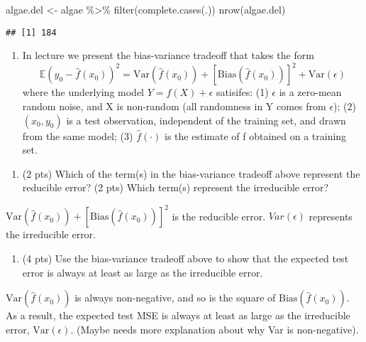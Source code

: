 \documentclass[
]{article}
\newenvironment{Shaded}{\begin{snugshade}}{\end{snugshade}}
\newcommand{\FunctionTok}[1]{\textcolor[rgb]{0.00,0.00,0.00}{#1}}
\newcommand{\NormalTok}[1]{#1}
\newcommand{\OtherTok}[1]{\textcolor[rgb]{0.56,0.35,0.01}{#1}}
\newcommand{\SpecialCharTok}[1]{\textcolor[rgb]{0.00,0.00,0.00}{#1}}
\providecommand{\tightlist}{%
  \setlength{\itemsep}{0pt}\setlength{\parskip}{0pt}}
\begin{document}
\begin{Shaded}
\begin{Highlighting}[]
\NormalTok{algae.del }\OtherTok{\textless{}{-}}\NormalTok{ algae }\SpecialCharTok{\%\textgreater{}\%} \FunctionTok{filter}\NormalTok{(}\FunctionTok{complete.cases}\NormalTok{(.))}
\FunctionTok{nrow}\NormalTok{(algae.del)}
\end{Highlighting}
\end{Shaded}

\begin{verbatim}
## [1] 184
\end{verbatim}

\begin{enumerate}
\def\labelenumi{\arabic{enumi}.}
\setcounter{enumi}{3}
\tightlist
\item
  In lecture we present the bias-variance tradeoff that takes the form
  \[\mathbb{E}(y_0-\hat{f}(x_0))^2 = \text{Var}(\hat{f}(x_0))+[\text{Bias}(\hat{f}(x_0))]^2+\text{Var}(\epsilon)\]
  where the underlying model \(Y = f(X) + \epsilon\) satisifes: (1)
  \(\epsilon\) is a zero-mean random noise, and X is non-random (all
  randomness in Y comes from \(\epsilon\)); (2) \((x_0, y_0)\) is a test
  observation, independent of the training set, and drawn from the same
  model; (3) \(\hat{f}(\cdot)\) is the estimate of f obtained on a
  training set.
\end{enumerate}

\begin{enumerate}
\def\labelenumi{\alph{enumi}.}
\tightlist
\item
  (2 pts) Which of the term(s) in the bias-variance tradeoff above
  represent the reducible error? (2 pts) Which term(s) represent the
  irreducible error?
\end{enumerate}

\(\text{Var}(\hat{f}(x_0))+[\text{Bias}(\hat{f}(x_0))]^2\) is the
reducible error. \(Var(\epsilon)\) represents the irreducible error.

\begin{enumerate}
\def\labelenumi{\alph{enumi}.}
\setcounter{enumi}{1}
\tightlist
\item
  (4 pts) Use the bias-variance tradeoff above to show that the expected
  test error is always at least as large as the irreducible error.
\end{enumerate}

\(\text{Var}(\hat{f}(x_0))\) is always non-negative, and so is the
square of \(\text{Bias}(\hat{f}(x_0))\). As a result, the expected test
MSE is always at least as large as the irreducible error,
\(\text{Var}(\epsilon)\). (Maybe needs more explanation about why Var is
non-negative).
\end{document}
